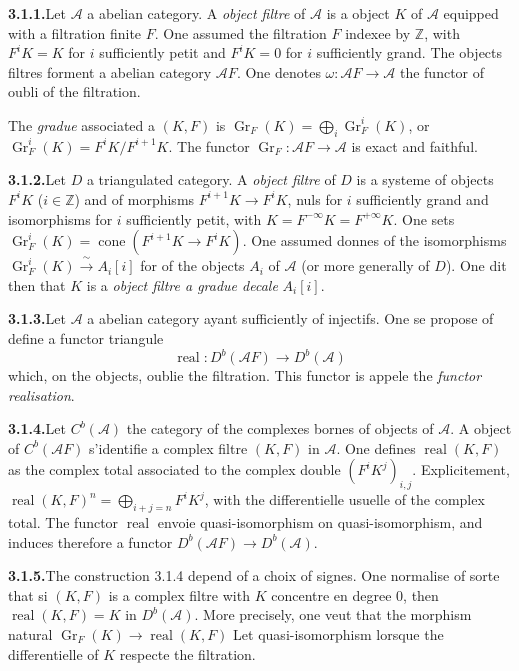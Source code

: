 \documentclass[12pt,a4paper]{article}
\theoremstyle{plain}
\theoremstyle{definition}
\DeclareMathOperator{\real}{real}
\DeclareMathOperator{\Gr}{Gr}
\DeclareMathOperator{\cone}{cone}
\begin{document}
\noindent\textbf{3.1.1.}\quad Let $\mathcal{A}$ a abelian category. A \emph{object filtre} of $\mathcal{A}$ is a object $K$ of $\mathcal{A}$ equipped with a filtration finite $F$. One assumed the filtration $F$ indexee by $\mathbb{Z}$, with $F^i K = K$ for $i$ sufficiently petit and $F^i K = 0$ for $i$ sufficiently grand. The objects filtres forment a abelian category $\mathcal{A}F$. One denotes $\omega : \mathcal{A}F \to \mathcal{A}$ the functor of oubli of the filtration.

The \emph{gradue} associated a $(K, F)$ is $\Gr_F(K) = \bigoplus_i \Gr_F^i(K)$, or $\Gr_F^i(K) = F^i K / F^{i+1} K$. The functor $\Gr_F : \mathcal{A}F \to \mathcal{A}$ is exact and faithful.

\smallskip
\noindent\textbf{3.1.2.}\quad Let $D$ a triangulated category. A \emph{object filtre} of $D$ is a systeme of objects $F^i K$ ($i \in \mathbb{Z}$) and of morphisms $F^{i+1} K \to F^i K$, nuls for $i$ sufficiently grand and isomorphisms for $i$ sufficiently petit, with $K = F^{-\infty} K = F^{+\infty} K$. One sets $\Gr_F^i(K) = \cone(F^{i+1} K \to F^i K)$. One assumed donnes of the isomorphisms $\Gr_F^i(K) \xrightarrow{\;\sim\;} A_i[i]$ for of the objects $A_i$ of $\mathcal{A}$ (or more generally of $D$). One dit then that $K$ is a \emph{object filtre a gradue decale} $A_i[i]$.

\smallskip
\noindent\textbf{3.1.3.}\quad Let $\mathcal{A}$ a abelian category ayant sufficiently of injectifs. One se propose of define a functor triangule
\[
\real : D^b(\mathcal{A}F) \to D^b(\mathcal{A})
\]
which, on the objects, oublie the filtration. This functor is appele the \emph{functor realisation}.

\smallskip
\noindent\textbf{3.1.4.}\quad Let $C^b(\mathcal{A})$ the category of the complexes bornes of objects of $\mathcal{A}$. A object of $C^b(\mathcal{A}F)$ s'identifie a complex filtre $(K, F)$ in $\mathcal{A}$. One defines $\real(K, F)$ as the complex total associated to the complex double $(F^i K^j)_{i,j}$. Explicitement, $\real(K, F)^n = \bigoplus_{i+j=n} F^i K^j$, with the differentielle usuelle of the complex total. The functor $\real$ envoie quasi-isomorphism on quasi-isomorphism, and induces therefore a functor $D^b(\mathcal{A}F) \to D^b(\mathcal{A})$.

\smallskip
\noindent\textbf{3.1.5.}\quad The construction 3.1.4 depend of a choix of signes. One normalise of sorte that si $(K, F)$ is a complex filtre with $K$ concentre en degree 0, then $\real(K, F) = K$ in $D^b(\mathcal{A})$. More precisely, one veut that the morphism natural $\Gr_F(K) \to \real(K, F)$ Let quasi-isomorphism lorsque the differentielle of $K$ respecte the filtration.
\end{document}
